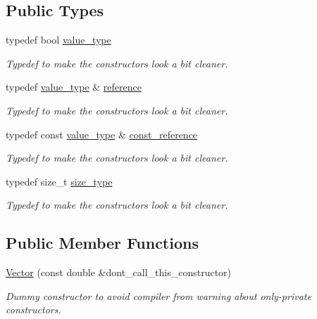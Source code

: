 \subsection*{Public Types}
\begin{DoxyCompactItemize}
\item 
typedef bool \hyperlink{classoomph_1_1Vector_3_01bool_01_4_ae0dcf1d783a209e5a9096b2292d8fab6}{value\+\_\+type}
\begin{DoxyCompactList}\small\item\em Typedef to make the constructors look a bit cleaner. \end{DoxyCompactList}\item 
typedef \hyperlink{classoomph_1_1Vector_3_01bool_01_4_ae0dcf1d783a209e5a9096b2292d8fab6}{value\+\_\+type} \& \hyperlink{classoomph_1_1Vector_3_01bool_01_4_aeb7603d575291ef47dcbade68b854f9a}{reference}
\begin{DoxyCompactList}\small\item\em Typedef to make the constructors look a bit cleaner. \end{DoxyCompactList}\item 
typedef const \hyperlink{classoomph_1_1Vector_3_01bool_01_4_ae0dcf1d783a209e5a9096b2292d8fab6}{value\+\_\+type} \& \hyperlink{classoomph_1_1Vector_3_01bool_01_4_abe598d2cdaa4b6fcb78d80c67ac5e761}{const\+\_\+reference}
\begin{DoxyCompactList}\small\item\em Typedef to make the constructors look a bit cleaner. \end{DoxyCompactList}\item 
typedef size\+\_\+t \hyperlink{classoomph_1_1Vector_3_01bool_01_4_a016848fc2d6e301e64a0209ade793732}{size\+\_\+type}
\begin{DoxyCompactList}\small\item\em Typedef to make the constructors look a bit cleaner. \end{DoxyCompactList}\end{DoxyCompactItemize}
\subsection*{Public Member Functions}
\begin{DoxyCompactItemize}
\item 
\hyperlink{classoomph_1_1Vector_3_01bool_01_4_a0af85cfa373f0845127ab472de8ea2c3}{Vector} (const double \&dont\+\_\+call\+\_\+this\+\_\+constructor)
\begin{DoxyCompactList}\small\item\em Dummy constructor to avoid compiler from warning about only-\/private constructors. \end{DoxyCompactList}\end{DoxyCompactItemize}
